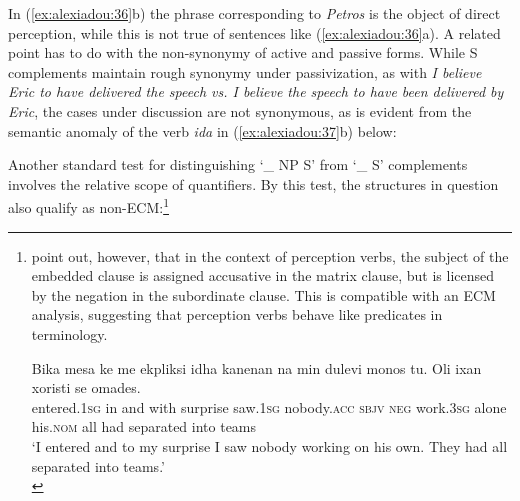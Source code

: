 \documentclass[output=paper]{langsci/langscibook}
\begin{document}
In (\ref{ex:alexiadou:36}b) the phrase corresponding to \textit{Petros} is the object of direct perception, while this is not true of sentences like (\ref{ex:alexiadou:36}a). A related point has to do with the non-synonymy of active and passive forms. While S complements maintain rough synonymy under passivization, as with \textit{I believe Eric to have delivered the speech vs. I believe the speech to have been delivered by Eric}, the cases under discussion are not synonymous, as is evident from the semantic anomaly of the verb \textit{ida} in (\ref{ex:alexiadou:37}b) below:

\ea%
    \label{ex:alexiadou:37}
    \z
\z
    
Another standard test for distinguishing ‘\_ NP S' from ‘\_ S' complements involves the relative scope of quantifiers. By this test, the structures in question also qualify as non-ECM:\footnote{\citet{Alexiadou2016} point out, however, that in the context of perception verbs, the subject of the embedded clause is assigned accusative in the matrix clause, but is licensed by the negation in the subordinate clause. This is compatible with an ECM analysis, suggesting that perception verbs behave like  predicates in  terminology.

\ea \gll Bika  mesa    ke me     ekpliksi idha       kanenan         na min dulevi monos tu. Oli ixan             xoristi      se omades.\\
        entered{}.\textsc{1sg} in   and with   surprise saw{}.\textsc{1sg} nobody{}.\textsc{acc}  \textsc{sbjv}  \textsc{neg} work{}.\textsc{3sg} alone his.\textsc{nom}    all had separated into teams\\
    \glt ‘I entered and to my surprise I saw nobody working on his own. They had all separated into teams.’\\
\z
        }
\end{document}
